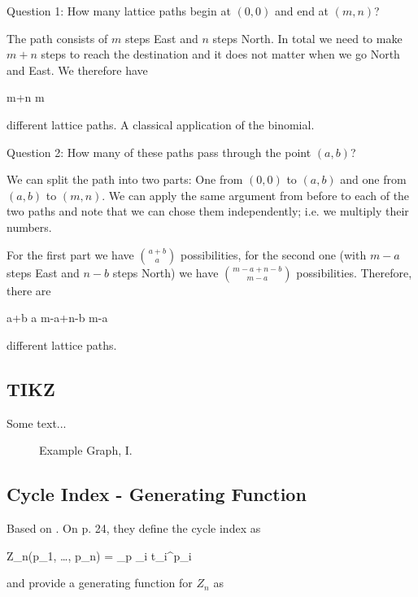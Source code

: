 Question 1: How many lattice paths begin at $(0, 0)$ and end at $(m, n)$?

The path consists of $m$ steps East and $n$ steps North. In total we need to make $m+n$ steps to reach the destination and it does not matter when we go North and East. We therefore have

\bee
{m+n \choose m}
\eee

different lattice paths. A classical application of the binomial.

Question 2: How many of these paths pass through the point $(a, b)$?

We can split the path into two parts: One from $(0,0)$ to $(a,b)$ and one from $(a,b)$ to $(m,n)$. We can apply the same argument from before to each of the two paths and note that we can chose them independently; i.e. we multiply their numbers.

For the first part we have ${a+b \choose a}$ possibilities, for the second one (with $m-a$ steps East and $n-b$ steps North) we have ${m-a+n-b \choose m-a}$ possibilities. Therefore, there are

\bee
{a+b \choose a} {m-a+n-b \choose m-a}
\eee

different lattice paths.

\subsection{TIKZ}

Some text...

\begin{figure}[H]
\centering
{}
\caption{Example Graph, I.}
\end{figure}


\subsection{Cycle Index - Generating Function}

Based on \cite{Stanley2012}. On p. 24, they define the cycle index as

\bee
Z_n(p_1, \ldots, p_n) =  \sum_p \prod_i t_i^{p_i}
\eee

and provide a generating function for $Z_n$ as

